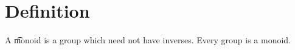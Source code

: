 
\section*{Definition}

A \t{monoid} is a group which need not have inverses.
Every group is a monoid.

\blankpage